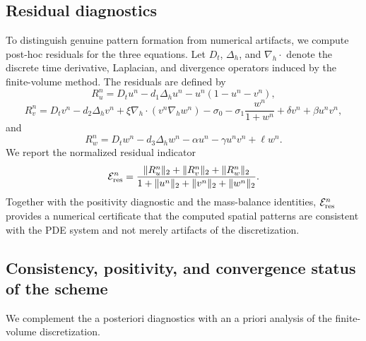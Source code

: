 \documentclass[a4paper,fleqn,longmktitle]{cas-sc}
\theoremstyle{plain}
\theoremstyle{definition}
\numberwithin{equation}{section}
\begin{document}
\subsection{Residual diagnostics}
\label{subsec:residual-diagnostics}

To distinguish genuine pattern formation from numerical artifacts, we compute
post-hoc residuals for the three equations. Let \(D_t\), \(\Delta_h\), and
\(\nabla_h\cdot\) denote the discrete time derivative, Laplacian, and divergence
operators induced by the finite-volume method. The residuals are defined by
\begin{equation}\label{eq:residual-u}
R_u^n
=
D_t u^n
-
d_1\Delta_h u^n
-
u^n(1-u^n-v^n),
\end{equation}
\begin{equation}\label{eq:residual-v}
R_v^n
=
D_t v^n
-
d_2\Delta_h v^n
+
\xi\nabla_h\cdot(v^n\nabla_h w^n)
-
\sigma_0-\sigma_1\frac{w^n}{1+w^n}
+\delta v^n+\beta u^n v^n,
\end{equation}
and
\begin{equation}\label{eq:residual-w}
R_w^n
=
D_t w^n
-
d_3\Delta_h w^n
-
\alpha u^n-\gamma u^n v^n+\ell w^n.
\end{equation}
We report the normalized residual indicator
\begin{equation}\label{eq:normalized-residual}
\mathcal E_{\rm res}^n
=
\frac{
\|R_u^n\|_2+\|R_v^n\|_2+\|R_w^n\|_2
}{
1+\|u^n\|_2+\|v^n\|_2+\|w^n\|_2
}.
\end{equation}
Together with the positivity diagnostic and the mass-balance identities,
\(\mathcal E_{\rm res}^n\) provides a numerical certificate that the computed
spatial patterns are consistent with the PDE system and not merely artifacts of
the discretization.


\subsection{Consistency, positivity, and convergence status of the scheme}
\label{subsec:positivity-cfl}

We complement the a posteriori diagnostics with an a priori analysis of the
finite-volume discretization.
\end{document}
